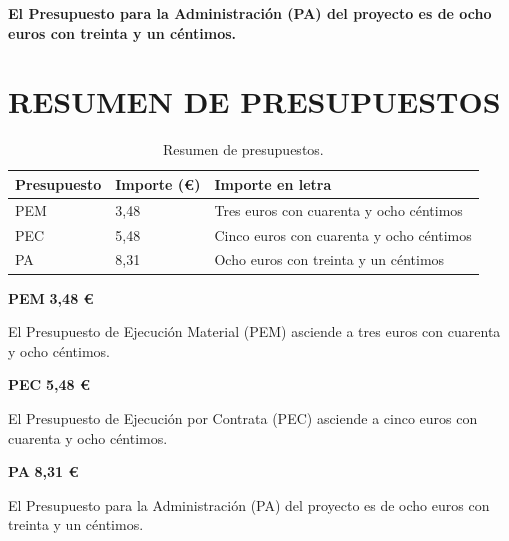 \documentclass[11pt,a4paper]{article}
\begin{document}
\noindent\textbf{El Presupuesto para la Administración (PA) del proyecto es de ocho euros con treinta y un céntimos.}

\newpage

\section{RESUMEN DE PRESUPUESTOS}

\begin{table}[htbp]
\centering
\footnotesize
\renewcommand{\arraystretch}{1.45}
\begin{tabular}{|p{5.0cm}|p{2.5cm}|p{7.0cm}|}
\hline
\rowcolor{ArthroTeal}
\textbf{\color{white}Presupuesto} & \textbf{\color{white}Importe (€)} & \textbf{\color{white}Importe en letra} \\
\hline
PEM & 3,48 & Tres euros con cuarenta y ocho céntimos \\
\hline
PEC & 5,48 & Cinco euros con cuarenta y ocho céntimos \\
\hline
PA & 8,31 & Ocho euros con treinta y un céntimos \\
\hline
\end{tabular}
\caption{Resumen de presupuestos.}
\label{tab:resumen-presupuestos}
\end{table}

\vspace{0.3cm}

\noindent\textbf{PEM} \hfill \textbf{3,48 €}

\noindent El Presupuesto de Ejecución Material (PEM) asciende a tres euros con cuarenta y ocho céntimos.

\vspace{0.3cm}

\noindent\textbf{PEC} \hfill \textbf{5,48 €}

\noindent El Presupuesto de Ejecución por Contrata (PEC) asciende a cinco euros con cuarenta y ocho céntimos.

\vspace{0.3cm}

\noindent\textbf{PA} \hfill \textbf{8,31 €}

\noindent El Presupuesto para la Administración (PA) del proyecto es de ocho euros con treinta y un céntimos.



\end{document}
